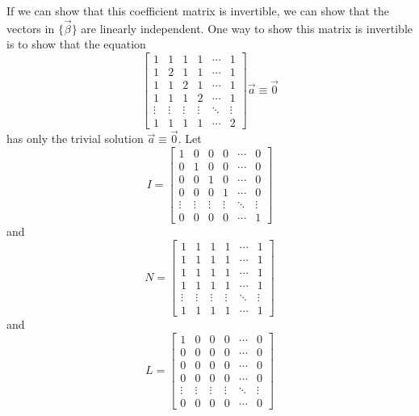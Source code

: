 \documentclass[a4paper, reqno, 12pt]{amsart}
\begin{document}
		If we can show that this coefficient matrix is invertible, we can show that the vectors in $\{\vec{\beta}\}$ are linearly independent. One way to show this 
		matrix is invertible is to show that the equation
		\[
			\begin{bmatrix}
				1      & 1      & 1      & 1      & \cdots & 1      \\
				1      & 2      & 1      & 1      & \cdots & 1      \\
				1      & 1      & 2      & 1      & \cdots & 1      \\
				1      & 1      & 1      & 2      & \cdots & 1      \\
				\vdots & \vdots & \vdots & \vdots & \ddots & \vdots \\
				1      & 1      & 1      & 1      & \cdots & 2
			\end{bmatrix}
			\vec{a} \equiv \vec{0}
		\]
		has only the trivial solution $\vec{a} \equiv \vec{0}$. Let
		\[
			I = 
			\begin{bmatrix}
				1      & 0      & 0      & 0      & \cdots & 0      \\
				0      & 1      & 0      & 0      & \cdots & 0      \\
				0      & 0      & 1      & 0      & \cdots & 0      \\
				0      & 0      & 0      & 1      & \cdots & 0      \\
				\vdots & \vdots & \vdots & \vdots & \ddots & \vdots \\
				0      & 0      & 0      & 0      & \cdots & 1
			\end{bmatrix}
		\]
		and
		\[
			N =
			\begin{bmatrix}
				1      & 1      & 1      & 1      & \cdots & 1      \\
				1      & 1      & 1      & 1      & \cdots & 1      \\
				1      & 1      & 1      & 1      & \cdots & 1      \\
				1      & 1      & 1      & 1      & \cdots & 1      \\
				\vdots & \vdots & \vdots & \vdots & \ddots & \vdots \\
				1      & 1      & 1      & 1      & \cdots & 1
			\end{bmatrix}
		\]
		and
		\[
			L = 
			\begin{bmatrix}
				1      & 0      & 0      & 0      & \cdots & 0      \\
				0      & 0      & 0      & 0      & \cdots & 0      \\
				0      & 0      & 0      & 0      & \cdots & 0      \\
				0      & 0      & 0      & 0      & \cdots & 0      \\
				\vdots & \vdots & \vdots & \vdots & \ddots & \vdots \\
				0      & 0      & 0      & 0      & \cdots & 0
			\end{bmatrix}
		\]
\end{document}
